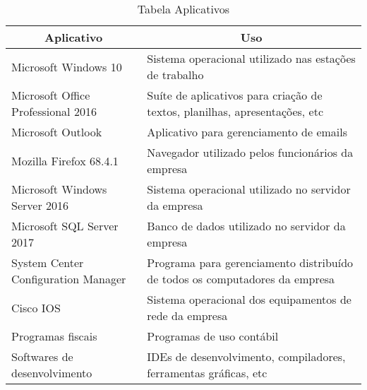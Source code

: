 \begin{table}[h!]
	\centering
	\begin{tabular}{|p{6cm}|p{10cm}|}
		\hline
		\multicolumn{1}{|c|}{\textbf{Aplicativo}} & \multicolumn{1}{c|}{\textbf{Uso}}                                           \\ \hline
		Microsoft Windows 10                      & Sistema operacional utilizado nas estações de trabalho                      \\ \hline
		Microsoft Office Professional 2016        & Suíte de aplicativos para criação de textos, planilhas, apresentações, etc  \\ \hline
		Microsoft Outlook                         & Aplicativo para gerenciamento de emails                                     \\ \hline
		Mozilla Firefox 68.4.1                    & Navegador utilizado pelos funcionários da empresa                           \\ \hline
		Microsoft Windows Server 2016             & Sistema operacional utilizado no servidor da empresa                        \\ \hline
		Microsoft SQL Server 2017                 & Banco de dados utilizado no servidor da empresa                             \\ \hline
		System Center Configuration Manager       & Programa para gerenciamento distribuído de todos os computadores da empresa \\ \hline
		Cisco IOS                                 & Sistema operacional dos equipamentos de rede da empresa                     \\ \hline
		Programas fiscais                         & Programas de uso contábil                                                   \\ \hline
		Softwares de desenvolvimento              & IDEs de desenvolvimento, compiladores, ferramentas gráficas, etc            \\ \hline
	\end{tabular}
	\caption{Tabela Aplicativos}
	\label{tab:aplicativos}
\end{table}



